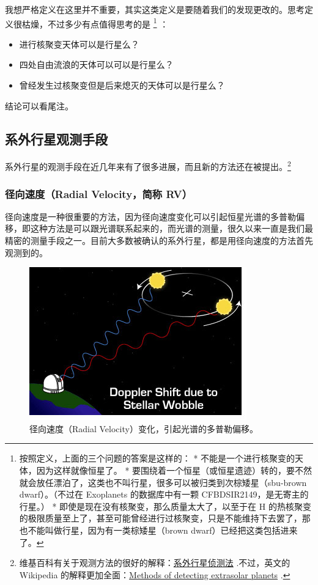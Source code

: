 \documentclass[letterpaper,10pt,english]{sphinxmanual}
\begin{document}
我想严格定义在这里并不重要，其实这类定义是要随着我们的发现更改的。思考定义很枯燥，不过多少有点值得思考的是 \footnote{
按照定义，上面的三个问题的答案是这样的：
* 不能是一个进行核聚变的天体，因为这样就像恒星了。
* 要围绕着一个恒星（或恒星遗迹）转的，要不然就会放任漂泊了，这类也不叫行星，很多可以被归类到次棕矮星（sbu-brown dwarf）。（不过在 Exoplanets 的数据库中有一颗 CFBDSIR2149，是无寄主的行星。）
* 即使是现在没有核聚变，那么质量太大了，以至于在 H 的热核聚变的极限质量至上了，甚至可能曾经进行过核聚变，只是不能维持下去罢了，那也不能叫做行星，因为有一类棕矮星（brown dwarf）已经把这类包括进来了。
} ：
\begin{itemize}
\item {} 
进行核聚变天体可以是行星么？

\item {} 
四处自由流浪的天体可以可以是行星么？

\item {} 
曾经发生过核聚变但是后来熄灭的天体可以是行星么？

\end{itemize}

结论可以看尾注。\footnotemark[1]


\subsection{系外行星观测手段}
\label{intro:id10}
系外行星的观测手段在近几年来有了很多进展，而且新的方法还在被提出。\footnote{
维基百科有关于观测方法的很好的解释：\href{http://zh.wikipedia.org/wiki/\%E7\%B3\%BB\%E5\%A4\%96\%E8\%A1\%8C\%E6\%98\%9F\%E5\%81\%B5\%E6\%B8\%AC\%E6\%B3\%95}{系外行星侦测法} .不过，英文的 Wikipedia 的解释更加全面：\href{http://en.wikipedia.org/wiki/Methods\_of\_detecting\_extrasolar\_planets}{Methods of detecting extrasolar planets} .
}


\subsubsection{径向速度（Radial Velocity，简称 RV）}
\label{intro:radial-velocity-rv}
径向速度是一种很重要的方法，因为径向速度变化可以引起恒星光谱的多普勒偏移，即这种方法是可以跟光谱联系起来的，而光谱的测量，很久以来一直是我们最精密的测量手段之一。目前大多数被确认的系外行星，都是用径向速度的方法首先观测到的。
\begin{figure}[htbp]
\centering
\capstart

\includegraphics{doppler1.jpg}
\caption{径向速度（Radial Velocity）变化，引起光谱的多普勒偏移。}\end{figure}
\end{document}
